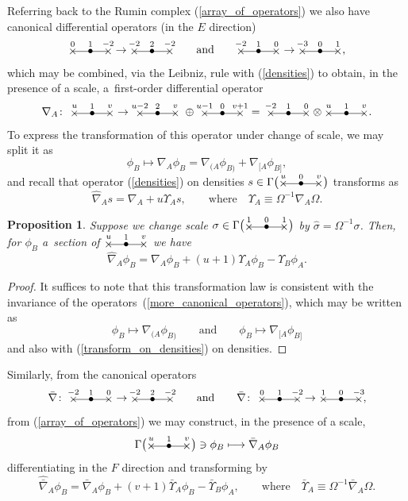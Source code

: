 \documentclass[pdftex]{sigma}%
\numberwithin{equation}{section}
\newtheorem{prop}[Theorem]{Proposition}
 { \theoremstyle{definition}
\newtheorem{Definition}[Theorem]{Definition}
\newtheorem{Note}[Theorem]{Note}
\newtheorem{Example}[Theorem]{Example}
\newtheorem{Remark}[Theorem]{Remark} }
\newcommand{\xox}[3]{\begin{picture}(40,11)
\put(4,1.5){\makebox(0,0){$\times$}}
\put(20,1.5){\makebox(0,0){$\bullet$}}
\put(36,1.5){\makebox(0,0){$\times$}}
\put(4,1.5){\line(1,0){32}}
\put(4,8){\makebox(0,0){$\scriptstyle #1$}}
\put(20,8){\makebox(0,0){$\scriptstyle #2$}}
\put(36,8){\makebox(0,0){$\scriptstyle #3$}}
\end{picture}}
\begin{document}
Referring back to the Rumin complex (\ref{array_of_operators}) we also
have canonical differential operators (in the $E$ direction)
\begin{equation}\label{more_canonical_operators}
\xox{0}{1}{-2} \to \xox{-2}{2}{-2}\qquad\mbox{and}\qquad
\xox{-2}{1}{0} \to \xox{-3}{0}{1},
\end{equation}
which may be combined, via the Leibniz, rule with (\ref{densities}) to obtain,
in the presence of a scale, a~first-order differential operator
\[
\nabla_A\colon \ \xox{u}{1}{v}\to\ \xox{u-2}{2}{v}\;\oplus\ \xox{u-1}{0}{v+1}
\ =\;\xox{-2}{1}{0}\otimes\xox{u}{1}{v}.\]
To express the transformation of this operator under change of scale,
we may split it as
\[\phi_B\mapsto\nabla_A\phi_B=\nabla_{(A}\phi_{B)}+\nabla_{[A}\phi_{B]},\]
and recall that operator (\ref{densities}) on densities
$s\in\Gamma\big(\xox{u}{0}{v}\big)$ transforms as
\begin{equation}\label{transform_on_densities}
\widehat\nabla_A s=\nabla_A+u\Upsilon_A s,\qquad\mbox{where}\quad
\Upsilon_A\equiv\Omega^{-1}\nabla_A\Omega.\end{equation}

\begin{prop} Suppose we change scale $\sigma\in\Gamma\big(\xox{1}{0}{1}\big)$ by
$\widehat\sigma=\Omega^{-1}\sigma$. Then, for $\phi_B$ a~section of
$\xox{u}{1}{v}$ we have
\begin{equation}\label{full_transformation_law}\widehat\nabla_A\phi_B
=\nabla_A\phi_B+(u+1)\Upsilon_A\phi_B-\Upsilon_B\phi_A.\end{equation}
\end{prop}
\begin{proof}
It suffices to note that this transformation law is consistent with the
invariance of the operators~(\ref{more_canonical_operators}), which may be
written as
\[\phi_B\longmapsto\nabla_{(A}\phi_{B)}\qquad\mbox{and}\qquad
\phi_B\longmapsto\nabla_{[A}\phi_{B]}\]
and also with (\ref{transform_on_densities}) on densities.
\end{proof}

Similarly, from the canonical operators
\[\bar\nabla\colon \ \xox{-2}{1}{0}\to\xox{-2}{2}{-2}\qquad\mbox{and}\qquad
\bar\nabla\colon \ \xox{0}{1}{-2}\to\xox{1}{0}{-3},\]
from (\ref{array_of_operators}) we may construct, in the presence of a scale,
\[\Gamma\big(\xox{u}{1}{v}\big)\ni\phi_B\longmapsto\bar\nabla_A\phi_B\]
differentiating in the $F$ direction and transforming by
\begin{equation}\label{full_barred_transformation_law}
\widehat{\bar\nabla}_A\phi_B=\bar\nabla_A\phi_B
+(v+1)\bar\Upsilon_A\phi_B
-\bar\Upsilon_B\phi_A,
\qquad\mbox{where}\quad \bar\Upsilon_A\equiv\Omega^{-1}\bar\nabla_A\Omega.
\end{equation}
\end{document}
